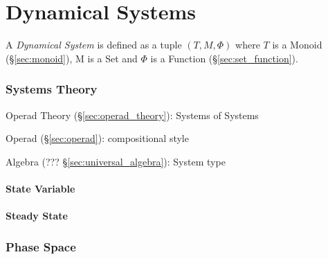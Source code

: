 \part{Dynamical Systems}\label{sec:dynamical_systems}

A \emph{Dynamical System} is defined as a tuple $(T,M,\Phi)$ where $T$
is a Monoid (\S\ref{sec:monoid}), M is a Set and $\Phi$ is a Function
(\S\ref{sec:set_function}).



\section{Systems Theory}\label{sec:systems_theory}


Operad Theory (\S\ref{sec:operad_theory}): Systems of Systems

Operad (\S\ref{sec:operad}): compositional style

Algebra (??? \S\ref{sec:universal_algebra}): System type



\subsection{State Variable}\label{sec:state_variable}

\subsection{Steady State}\label{sec:steady_state}



\section{Phase Space}\label{sec:phase_space}

